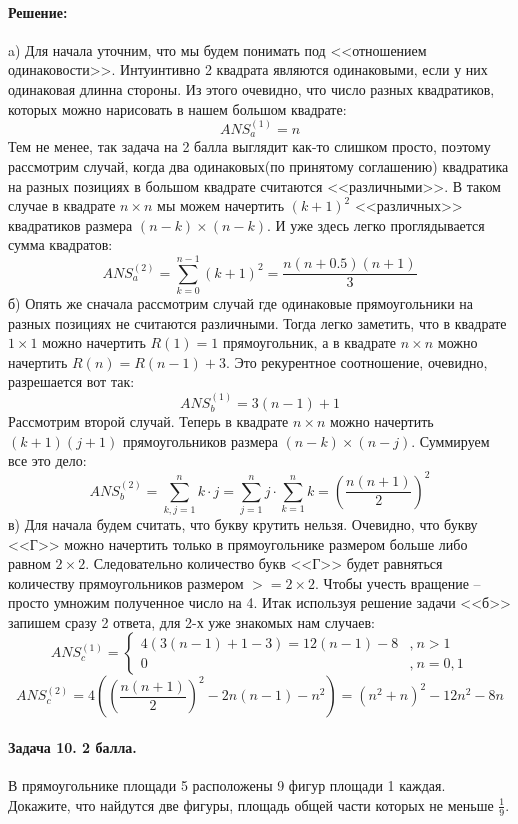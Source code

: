 \documentclass[12pt]{article}
\begin{document}
\paragraph{\bf Решение:}
a) Для начала уточним, что мы будем понимать под <<отношением одинаковости>>. Интуинтивно
2 квадрата являются одинаковыми, если у них одинаковая длинна стороны. Из этого очевидно,
что число разных квадратиков, которых можно нарисовать в нашем большом квадрате:
$$ ANS_a^{(1)} = n $$
Тем не менее, так задача на 2 балла выглядит как-то слишком просто, поэтому рассмотрим
случай, когда два одинаковых(по принятому соглашению) квадратика на разных позициях в большом
квадрате считаются <<различными>>. В таком случае в квадрате $n \times n$ мы можем начертить $(k + 1)^2$ <<различных>>
квадратиков размера $ (n-k) \times (n-k)$. И уже здесь легко проглядывается сумма квадратов:
$$ ANS_a^{(2)} = \sum\limits_{k = 0}^{n-1} (k + 1)^2 = \frac{n(n+0.5)(n+1)}{3} $$
б) Опять же сначала рассмотрим случай где одинаковые прямоугольники на разных позициях не считаются различными.
Тогда легко заметить, что в квадрате $1 \times 1$ можно начертить $R(1) = 1$ прямоугольник, а в квадрате
$n \times n$ можно начертить $R(n) = R(n - 1) + 3$. Это рекурентное соотношение, очевидно, разрешается вот так:
$$ ANS_b^{(1)} = 3(n - 1) + 1 $$
Рассмотрим второй случай. Теперь в квадрате $ n \times n $ можно начертить $ (k+1)(j+1) $ прямоугольников размера
$(n - k) \times (n - j) $. Суммируем все это дело:
$$ ANS_b^{(2)} = \sum\limits_{k, j = 1}^{n} k \cdot j = \sum\limits_{j = 1}^n j \cdot \sum\limits_{k = 1}^n k =
\left(\frac{n(n + 1)}{2}\right)^2 $$
в) Для начала будем считать, что букву крутить нельзя. Очевидно, что букву <<Г>> можно начертить только в 
прямоугольнике размером больше либо равном $ 2 \times 2 $. Следовательно количество букв <<Г>> будет равняться 
количеству прямоугольников размером $ >= 2 \times 2 $. Чтобы учесть вращение -- просто умножим полученное
число на 4. Итак используя решение задачи <<б>> запишем сразу 2 ответа, для 2-х уже знакомых нам случаев:
$$ 
ANS_c^{(1)} = \left\{
\begin{array}{rl}
4(3(n - 1) + 1 - 3) = 12(n - 1) - 8 &\mbox{,}\ n > 1\\
0 &\mbox{,}\ n = 0, 1
\end{array}
\right.
$$
$$
ANS_c^{(2)} = 
4\left(\left(\frac{n(n + 1)}{2}\right)^2 - 2n(n - 1) - n^2\right) = (n^2 + n)^2 - 12 n^2 - 8 n
$$

\paragraph{Задача 10. 2 балла.} В прямоугольнике площади 5 расположены 9 фигур 
площади 1 каждая. Докажите, что найдутся две фигуры, площадь общей 
части которых не меньше $ \frac{1}{9} $. 
\end{document}
